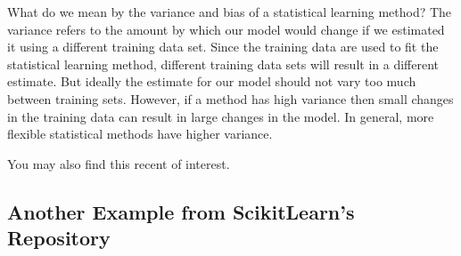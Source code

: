\documentclass[letterpaper,10pt,english]{sphinxmanual}
\begin{document}
What do we mean by the variance and bias of a statistical learning
method? The variance refers to the amount by which our model would change if we
estimated it using a different training data set. Since the training
data are used to fit the statistical learning method, different
training data sets  will result in a different estimate. But ideally the
estimate for our model should not vary too much between training
sets. However, if a method has high variance  then small changes in
the training data can result in large changes in the model. In general, more
flexible statistical methods have higher variance.

You may also find this recent  of interest.


\subsection{Another Example from Scikit\sphinxhyphen{}Learn’s Repository}
\label{\detokenize{chapter4:another-example-from-scikit-learn-s-repository}}
\end{document}

